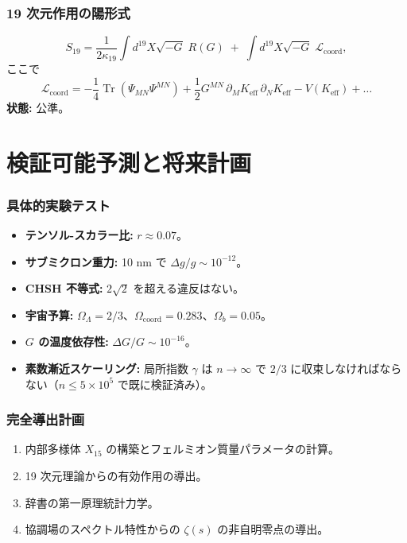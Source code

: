 \documentclass[11pt,a4paper]{article}
\DeclareMathOperator{\Tr}{Tr}
\newcommand{\coord}{\mathrm{coord}}
\begin{document}
	\section{19 次元作用の陽形式}
	\label{sec:19Dlagrangian}
	\[
	S_{19} = \frac{1}{2\kappa_{19}} \int d^{19}X \sqrt{-G}\; R(G) \;+\; \int d^{19}X \sqrt{-G}\; \mathcal{L}_{\text{coord}},
	\]
	ここで
	\[
	\mathcal{L}_{\text{coord}} = -\frac{1}{4} \Tr(\Psi_{MN}\Psi^{MN}) + \frac{1}{2} G^{MN}\,\partial_M K_{\mathrm{eff}}\,\partial_N K_{\mathrm{eff}} - V(K_{\mathrm{eff}}) + \dots
	\]
	\textbf{状態:} 公準。
	
	\part{検証可能予測と将来計画}
	
	\section{具体的実験テスト}
	\begin{itemize}
		\item \textbf{テンソル-スカラー比:} \(r \approx 0.07\)。
		\item \textbf{サブミクロン重力:} 10 nm で \(\Delta g/g \sim 10^{-12}\)。
		\item \textbf{CHSH 不等式:} \(2\sqrt{2}\) を超える違反はない。
		\item \textbf{宇宙予算:} \(\Omega_\Lambda = 2/3\)、\(\Omega_{\coord} = 0.283\)、\(\Omega_b = 0.05\)。
		\item \textbf{\(G\) の温度依存性:} \(\Delta G/G \sim 10^{-16}\)。
		\item \textbf{素数漸近スケーリング:} 局所指数 \(\gamma\) は \(n\to\infty\) で \(2/3\) に収束しなければならない（\(n\le 5\times10^5\) で既に検証済み）。
	\end{itemize}
	
	\section{完全導出計画}
	\begin{enumerate}
		\item 内部多様体 \(X_{15}\) の構築とフェルミオン質量パラメータの計算。
		\item 19 次元理論からの有効作用の導出。
		\item 辞書の第一原理統計力学。
		\item 協調場のスペクトル特性からの \(\zeta(s)\) の非自明零点の導出。
	\end{enumerate}
	
\end{document}
